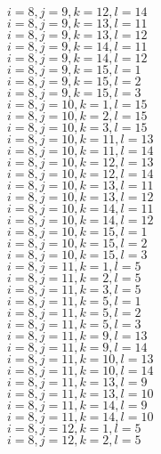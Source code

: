 \documentclass[14pt]{article}
\begin{document}
    $i=8,j=9,k=12,l=14 $ \\ 
    $i=8,j=9,k=13,l=11 $ \\ 
    $i=8,j=9,k=13,l=12 $ \\ 
    $i=8,j=9,k=14,l=11 $ \\ 
    $i=8,j=9,k=14,l=12 $ \\ 
    $i=8,j=9,k=15,l=1 $ \\ 
    $i=8,j=9,k=15,l=2 $ \\ 
    $i=8,j=9,k=15,l=3 $ \\ 
    $i=8,j=10,k=1,l=15 $ \\ 
    $i=8,j=10,k=2,l=15 $ \\ 
    $i=8,j=10,k=3,l=15 $ \\ 
    $i=8,j=10,k=11,l=13 $ \\ 
    $i=8,j=10,k=11,l=14 $ \\ 
    $i=8,j=10,k=12,l=13 $ \\ 
    $i=8,j=10,k=12,l=14 $ \\ 
    $i=8,j=10,k=13,l=11 $ \\ 
    $i=8,j=10,k=13,l=12 $ \\ 
    $i=8,j=10,k=14,l=11 $ \\ 
    $i=8,j=10,k=14,l=12 $ \\ 
    $i=8,j=10,k=15,l=1 $ \\ 
    $i=8,j=10,k=15,l=2 $ \\ 
    $i=8,j=10,k=15,l=3 $ \\ 
    $i=8,j=11,k=1,l=5 $ \\ 
    $i=8,j=11,k=2,l=5 $ \\ 
    $i=8,j=11,k=3,l=5 $ \\ 
    $i=8,j=11,k=5,l=1 $ \\ 
    $i=8,j=11,k=5,l=2 $ \\ 
    $i=8,j=11,k=5,l=3 $ \\ 
    $i=8,j=11,k=9,l=13 $ \\ 
    $i=8,j=11,k=9,l=14 $ \\ 
    $i=8,j=11,k=10,l=13 $ \\ 
    $i=8,j=11,k=10,l=14 $ \\ 
    $i=8,j=11,k=13,l=9 $ \\ 
    $i=8,j=11,k=13,l=10 $ \\ 
    $i=8,j=11,k=14,l=9 $ \\ 
    $i=8,j=11,k=14,l=10 $ \\ 
    $i=8,j=12,k=1,l=5 $ \\ 
    $i=8,j=12,k=2,l=5 $ \\ 
\end{document}
